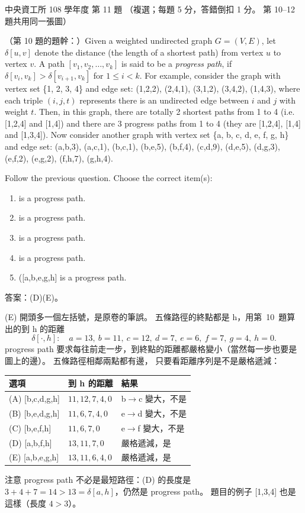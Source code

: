 \begin{pastexam}[label={px:ncu-108-dsa-11}]{中央資工所 108 學年度 第 11 題}
（複選；每題 5 分，答錯倒扣 1 分。 第 10--12 題共用同一張圖）

（第 10 題的題幹：）Given a weighted undirected graph $G = (V, E)$, let $\delta[u, v]$ denote the distance (the length
of a shortest path) from vertex $u$ to vertex $v$. A path $[v_1, v_2, \ldots, v_k]$ is said to be a
\textit{progress path}, if $\delta[v_i, v_k] > \delta[v_{i+1}, v_k]$ for $1 \le i < k$. For example,
consider the graph with vertex set \{1, 2, 3, 4\} and edge set: (1,2,2), (2,4,1), (3,1,2), (3,4,2),
(1,4,3), where each triple $(i, j, t)$ represents there is an undirected edge between $i$ and $j$
with weight $t$. Then, in this graph, there are totally 2 shortest paths from 1 to 4 (i.e. [1,2,4]
and [1,4]) and there are 3 progress paths from 1 to 4 (they are [1,2,4], [1,4] and [1,3,4]). Now
consider another graph with vertex set \{a, b, c, d, e, f, g, h\} and edge set: (a,b,3), (a,c,1),
(b,c,1), (b,e,5), (b,f,4), (c,d,9), (d,e,5), (d,g,3), (e,f,2), (e,g,2), (f,h,7), (g,h,4).

Follow the previous question. Choose the correct item(s):
\begin{enumerate}[label=(\Alph*)]
\item [b,c,d,g,h] is a progress path.
\item [b,e,d,g,h] is a progress path.
\item [b,e,f,h] is a progress path.
\item [a,b,f,h] is a progress path.
\item ([a,b,e,g,h] is a progress path.
\end{enumerate}
\end{pastexam}

\begin{pastsoln}
答案：(D)(E)。

(E) 開頭多一個左括號，是原卷的筆誤。 五條路徑的終點都是 h，用第~10~題算出的到 h 的距離
\[
\delta[\cdot, h]:\quad a = 13,\ b = 11,\ c = 12,\ d = 7,\ e = 6,\ f = 7,\ g = 4,\ h = 0 .
\]
progress path 要求每往前走一步，到終點的距離都嚴格變小（當然每一步也要是圖上的邊）。 五條路徑相鄰兩點都有邊，
只要看距離序列是不是嚴格遞減：
\begin{center}
\small
\begin{tabular}{lll}
\toprule
選項 & 到 h 的距離 & 結果 \\
\midrule
(A) [b,c,d,g,h] & $11, 12, 7, 4, 0$ & b$\to$c 變大，不是 \\
(B) [b,e,d,g,h] & $11, 6, 7, 4, 0$ & e$\to$d 變大，不是 \\
(C) [b,e,f,h] & $11, 6, 7, 0$ & e$\to$f 變大，不是 \\
(D) [a,b,f,h] & $13, 11, 7, 0$ & 嚴格遞減，是 \\
(E) [a,b,e,g,h] & $13, 11, 6, 4, 0$ & 嚴格遞減，是 \\
\bottomrule
\end{tabular}
\end{center}
注意 progress path 不必是最短路徑：(D) 的長度是 $3 + 4 + 7 = 14 > 13 = \delta[a, h]$，仍然是 progress path。
題目的例子 [1,3,4] 也是這樣（長度 $4 > 3$）。
\end{pastsoln}

